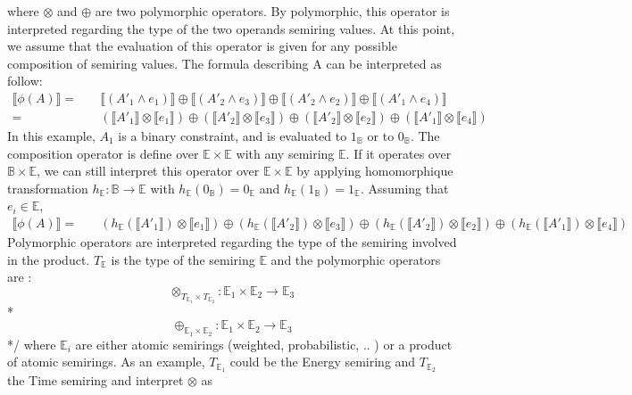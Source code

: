 \documentclass{article}
\begin{document}
where $\otimes$ and $\oplus$ are two polymorphic operators. By polymorphic, this operator is interpreted regarding the type of the two operands semiring values. At this point, we assume that the evaluation of this operator is given for any possible composition of semiring values. The formula describing A can be interpreted as follow:
\begin{align*}
\llbracket \phi(A) \rrbracket =  & \quad \llbracket( A'_1 \land e_{1})\rrbracket \oplus \llbracket( A'_2 \land e_{3})\rrbracket \oplus \llbracket(A'_2 \land e_{2})\rrbracket \oplus \llbracket( A'_1 \land e_{4})\rrbracket \\
					=  & \quad (\llbracket A'_1\rrbracket \otimes \llbracket e_{1}\rrbracket) \oplus (\llbracket A'_2\rrbracket \otimes \llbracket e_{3}\rrbracket) \oplus (\llbracket A'_2\rrbracket \otimes \llbracket e_{2}\rrbracket) \oplus (\llbracket A'_1\rrbracket \otimes \llbracket e_{4}\rrbracket)
\end{align*}
In this example, $A_1$ is a binary constraint, and is evaluated to $1_\mathbb{B}$ or to $0_\mathbb{B}$. The composition operator is define over $\mathbb{E}\times\mathbb{E}$ with any semiring $\mathbb{E}$. If it operates over $\mathbb{B}\times\mathbb{E}$, we can still interpret this operator over $\mathbb{E}\times\mathbb{E}$ by applying homomorphique transformation $h_\mathbb{E}:\mathbb{B} \to \mathbb{E}$ with $h_\mathbb{E}(0_\mathbb{B})=0_\mathbb{E}$ and $h_\mathbb{E}(1_\mathbb{B})=1_\mathbb{E}$. Assuming that $e_i \in \mathbb{E}$,  
\begin{align*}
\llbracket \phi(A) \rrbracket =  & \quad (h_\mathbb{E}(\llbracket A'_1\rrbracket) \otimes \llbracket e_{1}\rrbracket) \oplus (h_\mathbb{E}(\llbracket A'_2\rrbracket) \otimes \llbracket e_{3}\rrbracket) \oplus (h_\mathbb{E}(\llbracket A'_2\rrbracket) \otimes \llbracket e_{2}\rrbracket) \oplus (h_\mathbb{E}(\llbracket A'_1\rrbracket) \otimes \llbracket e_{4}\rrbracket)
\end{align*}
Polymorphic operators are interpreted regarding the type of the semiring involved in the product. $T_{\mathbb{E}}$ is the type of the semiring $\mathbb{E}$ and the polymorphic operators are : 
$$\otimes_{T_{\mathbb{E}_1} \times T_{\mathbb{E}_2}} : \mathbb{E}_1 \times \mathbb{E}_2 \to \mathbb{E}_3$$ 
\/*
$$\oplus_{\mathbb{E}_1 \times \mathbb{E}_2} : \mathbb{E}_1 \times \mathbb{E}_2 \to \mathbb{E}_3$$ 
*/
where $\mathbb{E}_i$ are either atomic semirings (weighted, probabilistic, .. ) or a product of atomic semirings. As an example, $T_{\mathbb{E}_1}$ could be the Energy semiring and $ T_{\mathbb{E}_2}$ the Time semiring and interpret $\otimes$ as
\end{document}
